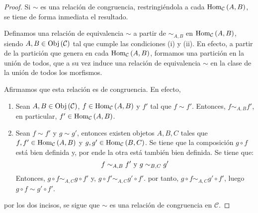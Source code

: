 \documentclass[12pt]{report}
\theoremstyle{largebreak}
\newcommand{\Obj}[1]{\ensuremath{\textup{Obj}\left(#1\right)}}
\newcommand{\Hom}[3]{\ensuremath{\textup{Hom}_{#1}\left(#2,#3\right)}}
\begin{document}
    \begin{proof}
        Si $\sim$ es una relación de congruencia, restringiéndola a cada $\Hom{\mathcal{C}}{A}{B}$, se tiene de forma inmediata el resultado.

        Definamos una relación de equivalencia $\sim$ a partir de $\sim_{A,B}$ en $\Hom{\mathcal{C}}{A}{B}$, siendo $A,B\in\Obj{\mathcal{C}}$ tal que cumple las condiciones (i) y (ii). En efecto, a partir de la partición que genera en cada $\Hom{\mathcal{C}}{A}{B}$, formamos una partición en la unión de todos, que a su vez induce una relación de equivalencia $\sim$ en la clase de la unión de todos los morfismos.

        Afirmamos que esta relación es de congruencia. En efecto,
        \begin{enumerate}
            \item Sean $A,B\in\Obj{\mathcal{C}}$, $f\in\Hom{\mathcal{C}}{A}{B}$ y $f'$ tal que $f\sim f'$. Entonces, $f\sim_{A,B}f'$, en particular, $f'\in\Hom{\mathcal{C}}{A}{B}$.
            \item Sean $f\sim f'$ y $g\sim g'$, entonces existen objetos $A,B,C$ tales que $f,f'\in\Hom{\mathcal{C}}{A}{B}$ y $g,g'\in\Hom{\mathcal{C}}{B}{C}$. Se tiene que la composición $g\circ f$ está bien definida y, por ende la otra está también bien definida. Se tiene que:
            \begin{equation*}
                f\sim_{A,B}f'\textup{ y }g\sim_{B,C}g'
            \end{equation*}
            Entonces, $g\circ f\sim_{A,C}g\circ f'$ y, $g\circ f'\sim_{A,C}g'\circ f'$. por tanto, $g\circ f\sim_{A,C}g'\circ f'$, luego $g\circ f\sim g'\circ f'$.
        \end{enumerate}
        por los dos incisos, se sigue que $\sim$ es una relación de congruencia en $\mathcal{C}$.


\end{proof}
\end{document}
